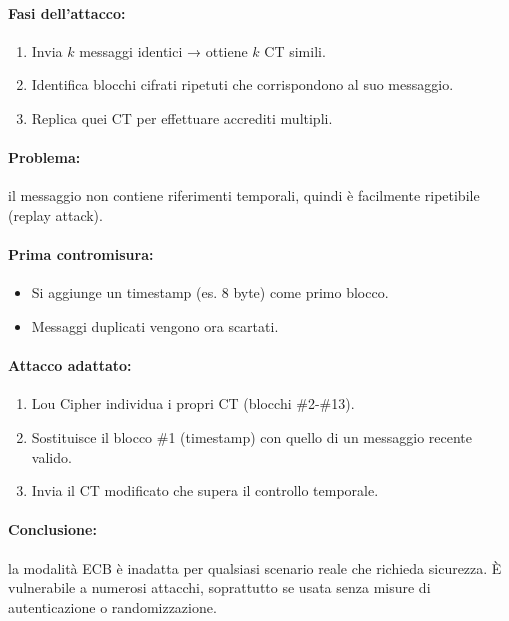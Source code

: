\documentclass{report}
\begin{document}
\paragraph{Fasi dell’attacco:}
\begin{enumerate}
    \item Invia $k$ messaggi identici → ottiene $k$ CT simili.
    \item Identifica blocchi cifrati ripetuti che corrispondono al suo messaggio.
    \item Replica quei CT per effettuare accrediti multipli.
\end{enumerate}

\paragraph{Problema:} il messaggio non contiene riferimenti temporali, quindi è facilmente ripetibile (replay attack).

\paragraph{Prima contromisura:}
\begin{itemize}
    \item Si aggiunge un timestamp (es. 8 byte) come primo blocco.
    \item Messaggi duplicati vengono ora scartati.
\end{itemize}

\paragraph{Attacco adattato:}
\begin{enumerate}
    \item Lou Cipher individua i propri CT (blocchi \#2-\#13).
    \item Sostituisce il blocco \#1 (timestamp) con quello di un messaggio recente valido.
    \item Invia il CT modificato che supera il controllo temporale.
\end{enumerate}

\paragraph{Conclusione:} la modalità ECB è inadatta per qualsiasi scenario reale che richieda sicurezza. È vulnerabile a numerosi attacchi, soprattutto se usata senza misure di autenticazione o randomizzazione.
\end{document}
